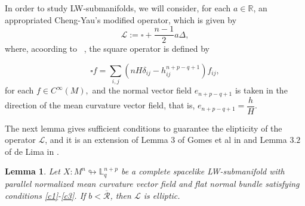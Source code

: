 \documentclass[leqno,11pt]{amsart}
\theoremstyle{plain}
\newtheorem{lemma}[theorem]{\indent\sc Lemma}
\theoremstyle{definition}
\numberwithin{equation}{section}
\begin{document}
In order to study LW-submanifolds, we will consider, for
each $a\in \mathbb{R}$, an appropriated Cheng-Yau’s modified operator, which is given
by
\begin{equation}\label{operadorL}
\mathcal{L} :=\square+\dfrac{n-1}{2}a\Delta,
\end{equation}
where, acoording to ~\cite{Cheng-Yau:77}, the square operator is defined by

\begin{equation}
\square f=\sum_{i,j}(nH\delta_{ij}-h_{ij}^{n+p-q+1})f_{ij},
\end{equation}
for each $f\in C^{\infty}(M),$ and the normal vector field $e_{n+p-q+1}$ is taken in the direction of the mean curvature vector field, that is, $e_{n+p-q+1}=\dfrac{h}{H}.$

The next lemma gives sufficient conditions to guarantee the elipticity of the operator $\mathcal{L}$, and it is an extension of Lemma 3 of Gomes et al in \cite{nazareno} and Lemma $3.2$ of de Lima in \cite{Lima: 13B}.


\begin{lemma}\label{L eliptico}
Let $X:M^n\looparrowright \mathbb{L}^{n+p}_{q}$ be a complete spacelike LW-submanifold with parallel normalized mean curvature vector field and flat normal bundle satisfying conditions \eqref{c1}-\eqref{c3}. If $b<\overline{\mathcal{R}}$, then $\mathcal{L}$ is elliptic.
\end{lemma}
\end{document}
